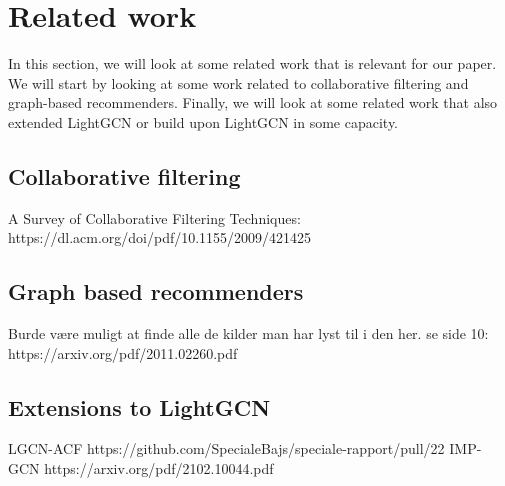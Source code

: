 \section{Related work}
In this section, we will look at some related work that is relevant for our paper.
We will start by looking at some work related to collaborative filtering and graph-based recommenders.
Finally, we will look at some related work that also extended LightGCN or build upon LightGCN in some capacity.

\subsection{Collaborative filtering}

A Survey of Collaborative Filtering Techniques:
https://dl.acm.org/doi/pdf/10.1155/2009/421425

\subsection{Graph based recommenders}

Burde være muligt at finde alle de kilder man har lyst til i den her. 
se side 10: https://arxiv.org/pdf/2011.02260.pdf



\subsection{Extensions to LightGCN}
LGCN-ACF
https://github.com/SpecialeBajs/speciale-rapport/pull/22
IMP-GCN
https://arxiv.org/pdf/2102.10044.pdf
